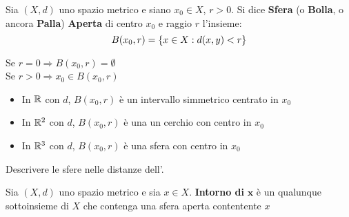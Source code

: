 \begin{definition}[Sfera]
	Sia $(X,d)$ uno spazio metrico e siano $x_0 \in X$, $r > 0$. Si dice \textbf{Sfera} (o \textbf{Bolla}, o ancora \textbf{Palla}) \textbf{Aperta} di centro $x_0$ e raggio $r$ l'insieme:
	$$B(x_0,r)=\left\{x\in X : d(x,y)<r\right\}$$
\end{definition}
\begin{observation}
	Se $r=0\Rightarrow B(x_0,r)=\emptyset$\\
	Se $r>0\Rightarrow x_0\in B(x_0,r)$
\end{observation}
\begin{example}\leavevmode\vspace*{-\baselineskip}
	\begin{itemize}
		\item In $\mathbb{R}$ con $d$, $B(x_0,r)$ è un intervallo simmetrico centrato in $x_0$
		\item In $\mathbb{R}^2$ con $d$, $B(x_0,r)$ è una un cerchio con centro in $x_0$
		\item In $\mathbb{R}^3$ con $d$, $B(x_0,r)$ è una sfera con centro in $x_0$
	\end{itemize}
\end{example}
\begin{exercise}
	Descrivere le sfere nelle distanze dell'.
\end{exercise}

\begin{definition}[Intorno]
	Sia $(X,d)$ uno spazio metrico e sia $x \in X$. \textbf{Intorno di} $\boldsymbol{x}$ è un qualunque sottoinsieme di $X$ che contenga una sfera aperta contentente $x$
\end{definition}

